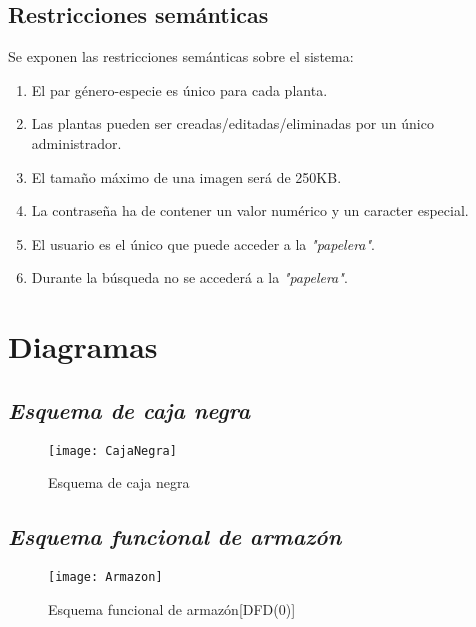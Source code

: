 \documentclass[10pt,a4paper]{article}
\begin{document}
\subsection{\textbf{Restricciones semánticas}}

Se exponen las restricciones semánticas sobre el sistema:
\newline

\begin{enumerate}[label=RS\arabic*. ,leftmargin=2.8\parindent]
	
	\item El par género-especie es único para cada planta.
	\item Las plantas pueden ser creadas/editadas/eliminadas por un único administrador.
	\item El tamaño máximo de una imagen será de 250KB.
	\item La contraseña ha de contener un valor numérico y un caracter especial.
	\item El usuario es el único que puede acceder a la \textit{"papelera"}.
	\item Durante la búsqueda no se accederá a la \textit{"papelera"}.
	
\end{enumerate}
\newpage 

\section{\textbf{Diagramas}}

\subsection{\textbf{\textit{Esquema de caja negra}}}

\begin{figure} [h]
\centering \texttt{[image: CajaNegra]}
\caption{Esquema de caja negra}
\end{figure}

\subsection{\textbf{\textit{Esquema funcional de armazón}}}

\begin{wrapfigure}[11]{l}{10cm}
\texttt{[image: Armazon]}
\caption{Esquema funcional de armazón[DFD(0)]}
\end{wrapfigure}
\end{document}
